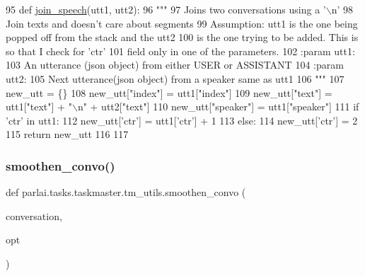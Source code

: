 \begin{DoxyCode}
95 \textcolor{keyword}{def }\hyperlink{namespaceparlai_1_1tasks_1_1taskmaster_1_1tm__utils_ad5d13cd462bd26919f078aa93174e9cd}{join\_speech}(utt1, utt2):
96     \textcolor{stringliteral}{"""}
97 \textcolor{stringliteral}{    Joins two conversations using a '\(\backslash\)n'}
98 \textcolor{stringliteral}{    Join texts and doesn't care about segments}
99 \textcolor{stringliteral}{    Assumption: utt1 is the one being popped off from the stack and the utt2}
100 \textcolor{stringliteral}{                is the one trying to be added. This is so that I check for 'ctr'}
101 \textcolor{stringliteral}{                field only in one of the parameters.}
102 \textcolor{stringliteral}{    :param utt1:}
103 \textcolor{stringliteral}{        An utterance (json object) from either USER or ASSISTANT}
104 \textcolor{stringliteral}{    :param utt2:}
105 \textcolor{stringliteral}{        Next utterance(json object) from a speaker same as utt1}
106 \textcolor{stringliteral}{    """}
107     new\_utt = \{\}
108     new\_utt[\textcolor{stringliteral}{"index"}] = utt1[\textcolor{stringliteral}{"index"}]
109     new\_utt[\textcolor{stringliteral}{"text"}] = utt1[\textcolor{stringliteral}{"text"}] + \textcolor{stringliteral}{"\(\backslash\)n"} + utt2[\textcolor{stringliteral}{"text"}]
110     new\_utt[\textcolor{stringliteral}{"speaker"}] = utt1[\textcolor{stringliteral}{"speaker"}]
111     \textcolor{keywordflow}{if} \textcolor{stringliteral}{'ctr'} \textcolor{keywordflow}{in} utt1:
112         new\_utt[\textcolor{stringliteral}{'ctr'}] = utt1[\textcolor{stringliteral}{'ctr'}] + 1
113     \textcolor{keywordflow}{else}:
114         new\_utt[\textcolor{stringliteral}{'ctr'}] = 2
115     \textcolor{keywordflow}{return} new\_utt
116 
117 
\end{DoxyCode}
\mbox{\label{namespaceparlai_1_1tasks_1_1taskmaster_1_1tm__utils_ad9cc917cf497b3cd81ccb76a719cf1b7}} 
\subsubsection{\texorpdfstring{smoothen\+\_\+convo()}{smoothen\_convo()}}
{\footnotesize\ttfamily def parlai.\+tasks.\+taskmaster.\+tm\+\_\+utils.\+smoothen\+\_\+convo (\begin{DoxyParamCaption}\item[{}]{conversation,  }\item[{}]{opt }\end{DoxyParamCaption})}

